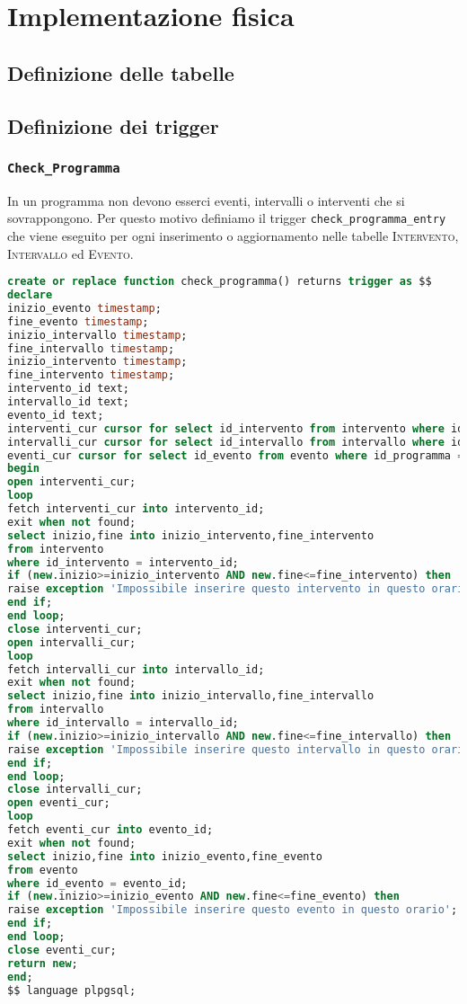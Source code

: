 \chapter{Implementazione fisica}

\section{Definizione delle tabelle}

\section{Definizione dei trigger}
\subsection{\texttt{Check\_Programma}}
In un programma non devono esserci eventi, intervalli o interventi che si sovrappongono. Per questo motivo definiamo il trigger \texttt{check\_programma\_entry} che viene eseguito per ogni inserimento o aggiornamento nelle tabelle \textsc{Intervento}, \textsc{Intervallo} ed \textsc{Evento}.
\begin{lstlisting}[language=SQL,style=mystyle,caption={check\_programma\_entry}]
create or replace function check_programma() returns trigger as $$
declare
inizio_evento timestamp;
fine_evento timestamp;
inizio_intervallo timestamp;
fine_intervallo timestamp;
inizio_intervento timestamp;
fine_intervento timestamp;
intervento_id text;
intervallo_id text;
evento_id text;
interventi_cur cursor for select id_intervento from intervento where id_programma = new.id_programma;
intervalli_cur cursor for select id_intervallo from intervallo where id_programma = new.id_programma;
eventi_cur cursor for select id_evento from evento where id_programma = new.id_programma;
begin
open interventi_cur;
loop 
fetch interventi_cur into intervento_id;
exit when not found;
select inizio,fine into inizio_intervento,fine_intervento
from intervento
where id_intervento = intervento_id;
if (new.inizio>=inizio_intervento AND new.fine<=fine_intervento) then
raise exception 'Impossibile inserire questo intervento in questo orario';
end if;
end loop;
close interventi_cur;
open intervalli_cur;
loop 
fetch intervalli_cur into intervallo_id;
exit when not found;
select inizio,fine into inizio_intervallo,fine_intervallo
from intervallo
where id_intervallo = intervallo_id;
if (new.inizio>=inizio_intervallo AND new.fine<=fine_intervallo) then
raise exception 'Impossibile inserire questo intervallo in questo orario';
end if;
end loop;
close intervalli_cur;
open eventi_cur;
loop 
fetch eventi_cur into evento_id;
exit when not found;
select inizio,fine into inizio_evento,fine_evento
from evento
where id_evento = evento_id;
if (new.inizio>=inizio_evento AND new.fine<=fine_evento) then
raise exception 'Impossibile inserire questo evento in questo orario';
end if;
end loop;
close eventi_cur;
return new;
end;
$$ language plpgsql;
\end{lstlisting}

